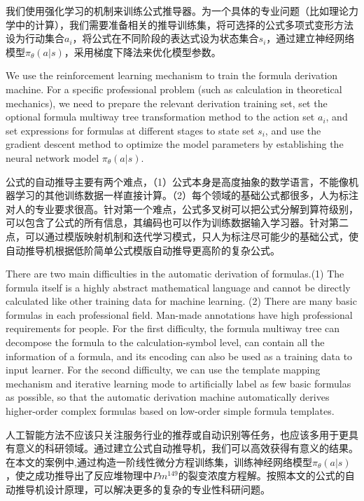 \documentclass[runningheads]{llncs}
\begin{document}
我们使用强化学习的机制来训练公式推导器。为一个具体的专业问题（比如理论力学中的计算），我们需要准备相关的推导训练集，将可选择的公式多项式变形方法设为行动集合${a_i}$，将公式在不同阶段的表达式设为状态集合${s_i}$，通过建立神经网络模型$\pi_{\theta}(a|s)$，采用梯度下降法来优化模型参数。

We use the reinforcement learning mechanism to train the formula derivation machine. For a specific professional problem (such as calculation in theoretical mechanics), we need to prepare the relevant derivation training set, set the optional formula multiway tree transformation method to the action set ${a_i}$, and set expressions for formulas at different stages to state set ${s_i}$, and use the gradient descent method to optimize the model parameters by establishing the neural network model $\pi_{\theta}(a|s)$.

公式的自动推导主要有两个难点，（1）公式本身是高度抽象的数学语言，不能像机器学习的其他训练数据一样直接计算。（2）每个领域的基础公式都很多，人为标注对人的专业要求很高。针对第一个难点，公式多叉树可以把公式分解到算符级别，可以包含了公式的所有信息，其编码也可以作为训练数据输入学习器。针对第二点，可以通过模版映射机制和迭代学习模式，只人为标注尽可能少的基础公式，使自动推导机根据低阶简单公式模版自动推导更高阶的复杂公式。

There are two main difficulties in the automatic derivation of formulas.(1) The formula itself is a highly abstract mathematical language and cannot be directly calculated like other training data for machine learning. (2) There are many basic formulas in each professional field. Man-made annotations have high professional requirements for people. For the first difficulty, the formula multiway tree can decompose the formula to the calculation-symbol level, can contain all the information of a formula, and its encoding can also be used as a training data to input learner. For the second difficulty, we can use the template mapping mechanism and iterative learning mode to artificially label as few basic formulas as possible, so that the automatic derivation machine automatically derives higher-order complex formulas based on low-order simple formula templates.

人工智能方法不应该只关注服务行业的推荐或自动识别等任务，也应该多用于更具有意义的科研领域。通过建立公式自动推导机，我们可以高效获得有意义的结果。在本文的案例中,通过构造一阶线性微分方程训练集，训练神经网络模型$\pi_{\theta}(a|s)$，使之成功推导出了反应堆物理中$Pm^{149}$的裂变浓度方程解。按照本文的公式的自动推导机设计原理，可以解决更多的复杂的专业性科研问题。
\end{document}

